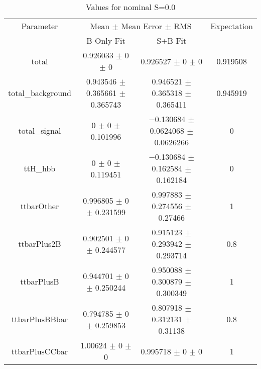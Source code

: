 \begin{table}
\centering
\caption{Values for nominal S=0.0}
\begin{tabular}{cccc}
\toprule
Parameter & \multicolumn{2}{c}{Mean $\pm$ Mean Error $\pm$ RMS} & Expectation\\
 & B-Only Fit & S+B Fit & \\
\midrule
total & \num{0.926033} $\pm$ \num{0} $\pm$ \num{0} & \num{0.926527} $\pm$ \num{0} $\pm$ \num{0} & \num{0.919508}\\
total\_background & \num{0.943546} $\pm$ \num{0.365661} $\pm$ \num{0.365743} & \num{0.946521} $\pm$ \num{0.365318} $\pm$ \num{0.365411} & \num{0.945919}\\
total\_signal & \num{0} $\pm$ \num{0} $\pm$ \num{0.101996} & \num{-0.130684} $\pm$ \num{0.0624068} $\pm$ \num{0.0626266} & \num{0}\\
ttH\_hbb & \num{0} $\pm$ \num{0} $\pm$ \num{0.119451} & \num{-0.130684} $\pm$ \num{0.162584} $\pm$ \num{0.162184} & \num{0}\\
ttbarOther & \num{0.996805} $\pm$ \num{0} $\pm$ \num{0.231599} & \num{0.997883} $\pm$ \num{0.274556} $\pm$ \num{0.27466} & \num{1}\\
ttbarPlus2B & \num{0.902501} $\pm$ \num{0} $\pm$ \num{0.244577} & \num{0.915123} $\pm$ \num{0.293942} $\pm$ \num{0.293714} & \num{0.8}\\
ttbarPlusB & \num{0.944701} $\pm$ \num{0} $\pm$ \num{0.250244} & \num{0.950088} $\pm$ \num{0.300879} $\pm$ \num{0.300349} & \num{1}\\
ttbarPlusBBbar & \num{0.794785} $\pm$ \num{0} $\pm$ \num{0.259853} & \num{0.807918} $\pm$ \num{0.312131} $\pm$ \num{0.31138} & \num{0.8}\\
ttbarPlusCCbar & \num{1.00624} $\pm$ \num{0} $\pm$ \num{0} & \num{0.995718} $\pm$ \num{0} $\pm$ \num{0} & \num{1}\\
\bottomrule
\end{tabular}
\end{table}